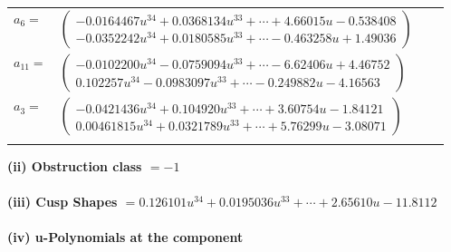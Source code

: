 \documentclass[1p]{elsarticle_modified}
\theoremstyle{definition}
\begin{document}
\begin{tabular}{m{7pt} m{180pt} m{7pt} m{180pt} }
\flushright $a_{6}=$&$\begin{pmatrix}-0.0164467 u^{34}+0.0368134 u^{33}+\cdots+4.66015 u-0.538408\\-0.0352242 u^{34}+0.0180585 u^{33}+\cdots-0.463258 u+1.49036\end{pmatrix}$ \\
\flushright $a_{11}=$&$\begin{pmatrix}-0.0102200 u^{34}-0.0759094 u^{33}+\cdots-6.62406 u+4.46752\\0.102257 u^{34}-0.0983097 u^{33}+\cdots-0.249882 u-4.16563\end{pmatrix}$ \\
\flushright $a_{3}=$&$\begin{pmatrix}-0.0421436 u^{34}+0.104920 u^{33}+\cdots+3.60754 u-1.84121\\0.00461815 u^{34}+0.0321789 u^{33}+\cdots+5.76299 u-3.08071\end{pmatrix}$\\&\end{tabular}
\flushleft \textbf{(ii) Obstruction class $= -1$}\\~\\
\flushleft \textbf{(iii) Cusp Shapes $= 0.126101 u^{34}+0.0195036 u^{33}+\cdots+2.65610 u-11.8112$}\\~\\
\newpage\renewcommand{\arraystretch}{1}
\flushleft \textbf{(iv) u-Polynomials at the component}\newline \\
\end{document}
